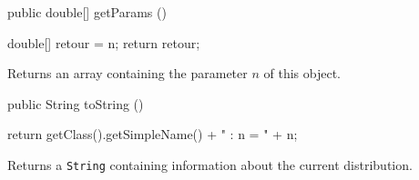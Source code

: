  \begin{code}

   public double[] getParams ()\begin{hide} {
      double[] retour = {n};
      return retour;
   }\end{hide}
\end{code}
\begin{tabb}
   Returns an array containing the parameter $n$ of this object.
\end{tabb}
\begin{hide}\begin{code}

   public String toString ()\begin{hide} {
      return getClass().getSimpleName() + " : n = " + n;
   }\end{hide}
\end{code}
\begin{tabb}
   Returns a \texttt{String} containing information about the current distribution.
\end{tabb}\end{hide}
\begin{code}\begin{hide}
}\end{hide}
\end{code}
